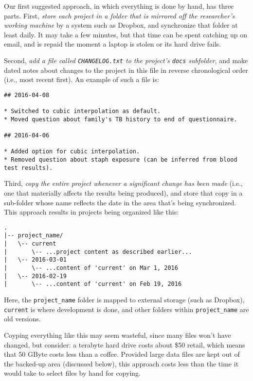 \documentclass[10pt]{article}
\newcommand{\recommend}[1]{\textit{#1}}
\begin{document}
Our first suggested approach, in which everything is done by hand, has
three parts. First, \recommend{store each project in a folder that is
  mirrored off the researcher's working machine} by a system such as
Dropbox, and synchronize that folder at least daily. It may take a few
minutes, but that time can be spent catching up on email, and is
repaid the moment a laptop is stolen or its hard drive fails.

Second, \recommend{add a file called \texttt{CHANGELOG.txt} to the
  project's \texttt{docs} subfolder}, and make dated notes about
changes to the project in this file in reverse chronological order
(i.e., most recent first). An example of such a file is:

\begin{verbatim}
## 2016-04-08

* Switched to cubic interpolation as default.
* Moved question about family's TB history to end of questionnaire.

## 2016-04-06

* Added option for cubic interpolation.
* Removed question about staph exposure (can be inferred from blood test results).
\end{verbatim}

Third, \recommend{copy the entire project whenever a significant
  change has been made} (i.e., one that materially affects the results
being produced), and store that copy in a sub-folder whose name
reflects the date in the area that's being synchronized. This approach
results in projects being organized like this:

\begin{verbatim}
.
|-- project_name/
|   \-- current
|       \-- ...project content as described earlier...
|   \-- 2016-03-01
|       \-- ...content of 'current' on Mar 1, 2016
|   \-- 2016-02-19
|       \-- ...content of 'current' on Feb 19, 2016
\end{verbatim}

Here, the \texttt{project\_name} folder is mapped to external storage
(such as Dropbox), \texttt{current} is where development is done, and
other folders within \texttt{project\_name} are old versions.

Coyping everything like this may seem wasteful, since many files won't
have changed, but consider: a terabyte hard drive costs about \$50
retail, which means that 50 GByte costs less than a coffee. Provided
large data files are kept out of the backed-up area (discussed below),
this approach costs less than the time it would take to select files by
hand for copying.
\end{document}
